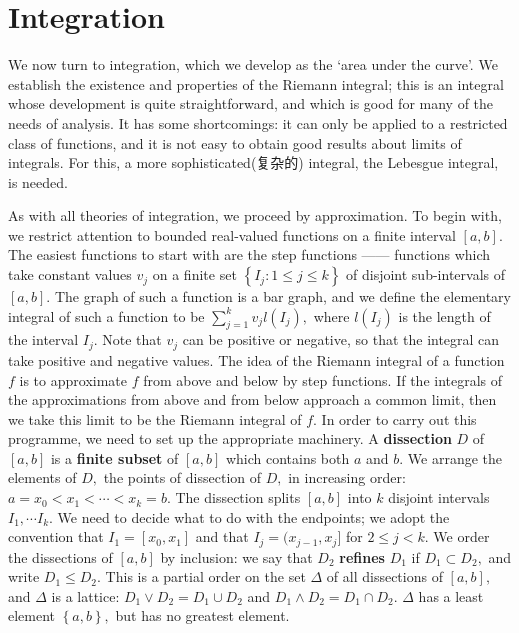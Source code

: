 \documentclass[12pt]{book}
\theoremstyle{definition}\newtheorem{dfn}{Définition}[chapter]
\theoremstyle{plain}\newtheorem{thm}{Théorème}[chapter]
\theoremstyle{plain}\newtheorem{prp}{Proposition}[chapter]
\theoremstyle{plain}\newtheorem{lem}{\bf Lemme}[chapter]
\theoremstyle{plain}\newtheorem{axm}{\bf Axiome}[chapter]
\theoremstyle{plain}\newtheorem{lmm}{\bf Lemme}[chapter]
\theoremstyle{plain}\newtheorem{cor}{\bf Corollaire}[chapter]
\theoremstyle{remark}\newtheorem{rem}{Remarque}[chapter]
\begin{document}
\chapter{Integration}
We now turn to integration, which we develop as the ‘area under the curve’. We establish the existence and properties of the Riemann integral; this is an integral whose development is quite straightforward, and which is good for many of the needs of analysis. It has some shortcomings: it can only be applied to a restricted class of functions, and it is not easy to obtain good results about limits of integrals. For this, a more sophisticated(复杂的) integral, the Lebesgue integral, is needed.

As with all theories of integration, we proceed by approximation. To
begin with, we restrict attention to bounded real-valued functions on
a finite interval $[a, b].$ The easiest functions to start with are
the step functions —— functions which take constant values $v_j$ on a
finite set $\left\{I_j : 1 \le j \le k\right\}$ of disjoint
sub-intervals of $[a, b].$ The graph of such a function is a bar
graph, and we define the elementary integral of such a function to be
$\sum^k_{j=1} v_jl(I_j),$ where $l(I_j)$ is the length of the interval
$I_j.$ Note that $v_j$ can be positive or negative, so that the
integral can take positive and negative values. The idea of the
Riemann integral of a function $f$ is to approximate $f$ from above
and below by step functions. If the integrals of the approximations
from above and from below approach a common limit, then we take this
limit to be the Riemann integral of $f.$ In order to carry out this
programme, we need to set up the appropriate machinery. A
{\bf{dissection}} $D$ of $[a, b]$ is a {\bf finite subset} of $[a, b]$ which contains both $a$ and $b.$ We arrange the elements of $D,$ the points of dissection of $D,$ in increasing order: $a = x_0 < x_1 < \cdots < x_k = b.$ The dissection splits $[a, b]$ into $k$ disjoint intervals $I_1,\cdots I_k.$ We need to decide what to do with the endpoints; we adopt the convention that $I_1 = [x_0, x_1]$ and that $I_j = (x_{j−1}, x_j ]$ for $2 \le j<k.$
We order the dissections of $[a, b]$ by inclusion: we say that $D_2$ {\bf{refines}} $D_1$ if $D_1 \subset D_2,$ and write $D_1 \le D_2.$ This is a partial order on the set $\Delta$ of all dissections of $[a, b],$ and $\Delta$ is a lattice: $D_1\vee D_2 = D_1 \cup D_2$ and $D_1 \wedge D_2 = D_1 \cap D_2.$ $\Delta$ has a least element $\left\{a, b\right\},$ but has no greatest element.
\end{document}
